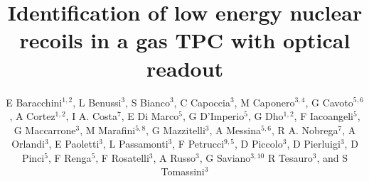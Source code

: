 \documentclass[12pt]{iopart}
\begin{document}
\title[]{Identification of low energy nuclear recoils in a gas TPC with optical readout}

\newcommand {\ie}{\mbox{i.e.}\xspace}     %
\newcommand {\eg}{\mbox{e.g.}\xspace}     %

\newcommand{\fe}{\ensuremath{^{55}\textrm{Fe}}\xspace}
\newcommand{\abs}[1]{\ensuremath{\vert #1 \vert}}
\newcommand{\ambe}{\ensuremath{\textrm{Am} \textrm{Be}}\xspace}
\newcommand{\isclu}{\ensuremath{I_{SC}}\xspace}
\newcommand{\tsigmag}{\ensuremath{\sigma^T_{Gauss}}\xspace}
\newcommand{\dedl}{\ensuremath{\frac{dE}{dl_p}}\xspace}

\newcommand{\lemon}{{\textsc{Lemon}}\xspace}
\newcommand{\cygno}{{\textsc{Cygno}}\xspace}
\newcommand{\idbscan}{{\textsc{Idbscan}}\xspace}
\newcommand{\dbscan}{{\textsc{dbscan}}\xspace}
\newcommand{\gac}{{\textsc{Gac}}\xspace}
\newcommand{\nnc}{{\textsc{Nnc}}\xspace}
\newcommand{\GEANTfour} {{\textsc{Geant4}}\xspace}
\newcommand{\SRIM} {{\textsc{Srim}}\xspace}
\newcommand{\garfield} {{\textsc{Garfield}}\xspace}
\newcommand{\PYTHONthree} {{\textsc{Python3}}\xspace}
\newcommand{\ROOT} {{\textsc{Root6}}\xspace}

\newcommand{\unit}[1]{\ensuremath{\textrm{\,#1}}\xspace}
\newcommand{\keV}{\ensuremath{\,\textrm{ke\hspace{-.08em}V}}\xspace}
\newcommand{\MeV}{\ensuremath{\,\textrm{Me\hspace{-.08em}V}}\xspace}




\author{E Baracchini$^{1,2}$,
L Benussi$^{3}$,
S Bianco$^{3}$,
C Capoccia$^{3}$, 
M Caponero$^{3,4}$,
G Cavoto$^{5,6}$,
A Cortez$^{1,2}$,
I A. Costa$^{7}$,
E Di Marco$^{5}$,
G D'Imperio$^{5}$,
G Dho$^{1,2}$,
F Iacoangeli$^{5}$,
G Maccarrone$^{3}$,
M Marafini$^{5,8}$,
G Mazzitelli$^{3}$,
A Messina$^{5,6}$,
R A. Nobrega$^{7}$,
A Orlandi$^{3}$,
E Paoletti$^{3}$,
L Passamonti$^{3}$,
F Petrucci$^{9,5}$,
D Piccolo$^{3}$,
D Pierluigi$^{3}$,
D Pinci$^{5}$,
F Renga$^{5}$,
F Rosatelli$^{3}$,
A Russo$^{3}$,
G Saviano$^{3,10}$
R Tesauro$^{3}$,
and S Tomassini$^{3}$}

\address{$^1$Gran~Sasso~Science~Institute, L'Aquila, Italy}
\address{$^2$INFN, Laboratori Nazionali del Gran Sasso, Assergi, Italy}
\address{$^3$INFN, Laboratori Nazionali di Frascati, Frascati, Italy}
\address{$^4$ENEA Centro Ricerche Frascati, Frascati, Italy}
\address{$^5$INFN, Sezione di Roma, Roma, Italy}
\address{$^6$Dipartimento di Fisica, Sapienza Universit\`a di Roma, Roma, Italy}
\address{$^7$Universidade Federal de Juiz de Fora, Juiz de Fora, Brasil}
\address{$^8$Museo Storico della Fisica e Centro Studi e Ricerche ``Enrico Fermi'', Roma, Italy}
\address{$^9$Dipartimento di Matematica e Fisica, Universit\`a Roma TRE, Roma, Italy}
\address{$^{10}$Dipartimento di Ingegneria Chimica, Materiali e Ambiente, Sapienza Universit\`a di Roma, Roma, Italy}
\end{document}
